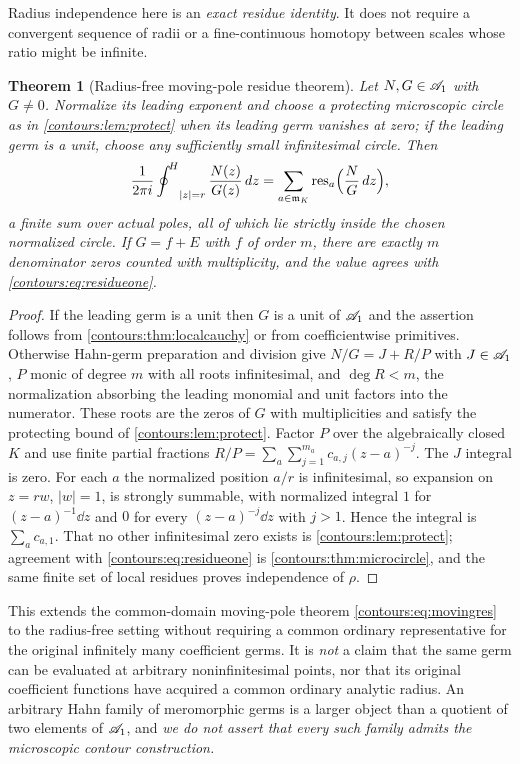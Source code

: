 \documentclass[11pt,letterpaper]{article}
\newtheorem{theorem}{Theorem}[section]
\theoremstyle{definition}
\theoremstyle{remark}
\newcommand{\m}{\mathfrak m}\newcommand{\st}{\operatorname{st}}
\newcommand{\res}{\operatorname{res}}\newcommand{\wind}{\operatorname{wind}}
\newcommand{\HCoint}{\mathop{\oint^{\!H}}\nolimits}
\numberwithin{equation}{section}
\begin{document}
Radius independence here is an \emph{exact residue identity}. It does not require a
convergent sequence of radii or a fine-continuous homotopy between scales whose
ratio might be infinite.

\begin{theorem}[Radius-free moving-pole residue theorem]
\label{contours:thm:localresidue}
Let $N,G\in\mathscr A_1$ with $G\ne0$. Normalize its leading exponent and choose a
protecting microscopic circle as in \cref{contours:lem:protect} when its leading
germ vanishes at zero; if the leading germ is a unit, choose any sufficiently small
infinitesimal circle. Then
\begin{equation}\label{contours:eq:localresidue}
  \frac1{2\pi i}\HCoint_{|z|=r}\frac{N(z)}{G(z)}\dd z
  =\sum_{a\in\m_K}\res_a\Bigl(\frac NG\dd z\Bigr),
\end{equation}
a finite sum over actual poles, all of which lie strictly inside the chosen
normalized circle. If $G=f+E$ with $f$ of order $m$, there are exactly $m$
denominator zeros counted with multiplicity, and the value agrees with
\eqref{contours:eq:residueone}.
\end{theorem}
\begin{proof}
If the leading germ is a unit then $G$ is a unit of $\mathscr A_1$ and the assertion follows
from \cref{contours:thm:localcauchy} or from coefficientwise primitives. Otherwise
Hahn-germ preparation and division \cite[\S4]{Geometry} give $N/G=J+R/P$ with
$J\in\mathscr A_1$, $P$ monic of degree $m$ with all roots infinitesimal, and $\deg R<m$,
the normalization absorbing the leading monomial and unit factors into the
numerator. These roots are the zeros of $G$ with multiplicities and satisfy the
protecting bound of \cref{contours:lem:protect}. Factor $P$ over the algebraically
closed $K$ and use finite partial fractions
$R/P=\sum_a\sum_{j=1}^{m_a}c_{a,j}(z-a)^{-j}$. The $J$ integral is zero. For each
$a$ the normalized position $a/r$ is infinitesimal, so expansion on $z=rw$,
$|w|=1$, is strongly summable, with normalized integral $1$ for $(z-a)^{-1}\dd z$
and $0$ for every $(z-a)^{-j}\dd z$ with $j>1$. Hence the integral is
$\sum_ac_{a,1}$. That no other infinitesimal zero exists is
\cref{contours:lem:protect}; agreement with
\eqref{contours:eq:residueone} is \cref{contours:thm:microcircle}, and the same
finite set of local residues proves independence of $\rho$.
\end{proof}

This extends the common-domain moving-pole theorem \eqref{contours:eq:movingres} to
the radius-free setting without requiring a common ordinary representative for the
original infinitely many coefficient germs. It is \emph{not} a claim that the same
germ can be evaluated at arbitrary noninfinitesimal points, nor that its original
coefficient functions have acquired a common ordinary analytic radius. An arbitrary
Hahn family of meromorphic germs is a larger object than a quotient of two elements
of $\mathscr A_1$, and \emph{we do not assert that every such family admits the microscopic
contour construction.}
\end{document}
